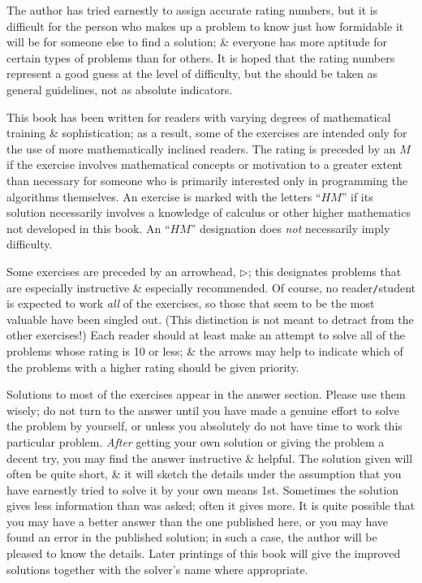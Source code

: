 \documentclass{article}
\begin{document}
The author has tried earnestly to assign accurate rating numbers, but it is difficult for the person who makes up a problem to know just how formidable it will be for someone else to find a solution; \& everyone has more aptitude for certain types of problems than for others. It is hoped that the rating numbers represent a good guess at the level of difficulty, but the should be taken as general guidelines, not as absolute indicators.

This book has been written for readers with varying degrees of mathematical training \& sophistication; as a result, some of the exercises are intended only for the use of more mathematically inclined readers. The rating is preceded by an $M$ if the exercise involves mathematical concepts or motivation to a greater extent than necessary for someone who is primarily interested only in programming the algorithms themselves. An exercise is marked with the letters ``$HM$'' if its solution necessarily involves a knowledge of calculus or other higher mathematics not developed in this book. An ``$HM$'' designation does {\it not} necessarily imply difficulty.

Some exercises are preceded by an arrowhead, $\triangleright$; this designates problems that are especially instructive \& especially recommended. Of course, no reader{\tt/}student is expected to work {\it all} of the exercises, so those that seem to be the most valuable have been singled out. (This distinction is not meant to detract from the other exercises!) Each reader should at least make an attempt to solve all of the problems whose rating is 10 or less; \& the arrows may help to indicate which of the problems with a higher rating should be given priority.

Solutions to most of the exercises appear in the answer section. Please use them wisely; do not turn to the answer until you have made a genuine effort to solve the problem by yourself, or unless you absolutely do not have time to work this particular problem. {\it After} getting your own solution or giving the problem a decent try, you may find the answer instructive \& helpful. The solution given will often be quite short, \& it will sketch the details under the assumption that you have earnestly tried to solve it by your own means 1st. Sometimes the solution gives less information than was asked; often it gives more. It is quite possible that you may have a better answer than the one published here, or you may have found an error in the published solution; in such a case, the author will be pleased to know the details. Later printings of this book will give the improved solutions together with the solver's name where appropriate.
\end{document}
